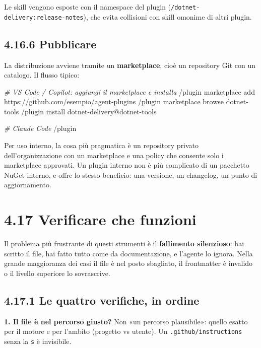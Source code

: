 \documentclass[
  italian,
  10pt,
]{book}
\newenvironment{Shaded}{\begin{snugshade}}{\end{snugshade}}
\newcommand{\CommentTok}[1]{\textcolor[rgb]{0.56,0.35,0.01}{\textit{#1}}}
\newcommand{\ExtensionTok}[1]{#1}
\newcommand{\NormalTok}[1]{#1}
\begin{document}
Le skill vengono esposte con il namespace del plugin
(\texttt{/dotnet-delivery:release-notes}), che evita collisioni con
skill omonime di altri plugin.

\subsection{4.16.6 Pubblicare}\label{pubblicare}

La distribuzione avviene tramite un \textbf{marketplace}, cioè un
repository Git con un catalogo. Il flusso tipico:

\begin{Shaded}
\begin{Highlighting}[]
\CommentTok{\# VS Code / Copilot: aggiungi il marketplace e installa}
\ExtensionTok{/plugin}\NormalTok{ marketplace add https://github.com/esempio/agent{-}plugins}
\ExtensionTok{/plugin}\NormalTok{ marketplace browse dotnet{-}tools}
\ExtensionTok{/plugin}\NormalTok{ install dotnet{-}delivery@dotnet{-}tools}

\CommentTok{\# Claude Code}
\ExtensionTok{/plugin}
\end{Highlighting}
\end{Shaded}

Per uso interno, la cosa più pragmatica è un repository privato
dell'organizzazione con un marketplace e una policy che consente solo i
marketplace approvati. Un plugin interno non è più complicato di un
pacchetto NuGet interno, e offre lo stesso beneficio: una versione, un
changelog, un punto di aggiornamento.

\section{4.17 Verificare che funzioni}\label{verificare-che-funzioni}

Il problema più frustrante di questi strumenti è il \textbf{fallimento
silenzioso}: hai scritto il file, hai fatto tutto come da
documentazione, e l'agente lo ignora. Nella grande maggioranza dei casi
il file è nel posto sbagliato, il frontmatter è invalido o il livello
superiore lo sovrascrive.

\subsection{4.17.1 Le quattro verifiche, in
ordine}\label{le-quattro-verifiche-in-ordine}

\textbf{1. Il file è nel percorso giusto?} Non «un percorso plausibile»:
quello esatto per il motore e per l'ambito (progetto vs utente). Un
\texttt{.github/instructions} senza la \texttt{s} è invisibile.
\end{document}
